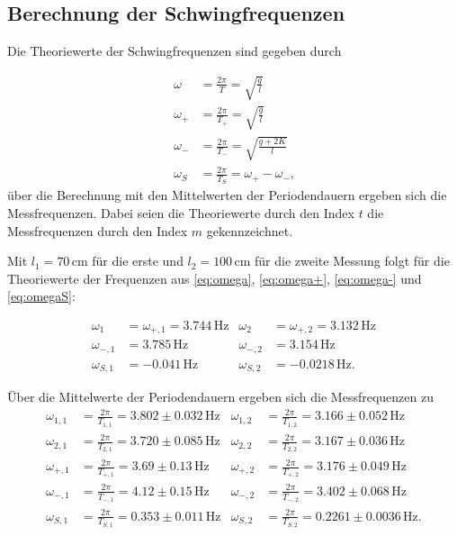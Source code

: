 \newpage

\subsection{Berechnung der Schwingfrequenzen}

Die Theoriewerte der Schwingfrequenzen sind gegeben durch

\begin{align}
  \omega   & = \frac{2π}{T}     =   \sqrt{\frac{g}{l}} \label{eq:omega} \\
  \omega_+ & = \frac{2π}{T_+} =   \sqrt{\frac{g}{l}} \label{eq:omega+} \\
  \omega_- & = \frac{2π}{T_-} =\sqrt{\frac{g+2K}{l}} \label{eq:omega-} \\
  \omega_S & = \frac{2π}{T_S} =  \omega_+ -\omega_- \label{eq:omegaS} \text{,}
\end{align}
über die Berechnung mit den Mittelwerten der Periodendauern ergeben sich die Messfrequenzen. Dabei seien die Theoriewerte durch den Index $t$
die Messfrequenzen durch den Index $m$ gekennzeichnet.

Mit $l_1=70 \, \unit{\centi\meter}$ für die erste und $l_2= 100 \, \unit{\centi\meter}$ für die zweite Messung folgt für die Theoriewerte der Frequenzen aus \eqref{eq:omega}, \eqref{eq:omega+}, \eqref{eq:omega-} und \eqref{eq:omegaS}:

\begin{align}
\omega_1 & = \omega_{+,1} = 3.744 \, \unit{\hertz}   & \omega_2 & = \omega_{+,2} = 3.132 \, \unit{\hertz} \nonumber\\
\omega_{-,1} & = 3.785            \, \unit{\hertz}   & \omega_{-,2} & = 3.154            \, \unit{\hertz} \nonumber \\
\omega_{S,1} & = -0.041           \, \unit{\hertz}   & \omega_{S,2} & = -0.0218          \, \unit{\hertz} \nonumber \text{.}
\end{align}

Über die Mittelwerte der Periodendauern ergeben sich die Messfrequenzen zu
\begin{align}
\omega_{1,1} & = \frac{2π}{T_{1,1}}   = 3.802 \pm 0.032     \,\unit{\hertz}& \omega_{1,2} & =  \frac{2π}{T_{1,2}}         = 3.166   \pm 0.052 \,\unit{\hertz}   \nonumber\\
\omega_{2,1} & = \frac{2π}{T_{2,1}}  = 3.720 \pm 0.085      \,\unit{\hertz}& \omega_{2,2} & =  \frac{2π}{T_{2,2}}         = 3.167   \pm 0.036 \,\unit{\hertz}   \nonumber\\
\omega_{+,1} & = \frac{2π}{T_{+,1}}  = 3.69 \pm 0.13        \,\unit{\hertz}& \omega_{+,2} & =  \frac{2π}{T_{+,2}}         = 3.176   \pm 0.049 \,\unit{\hertz}   \nonumber\\
\omega_{-,1} & = \frac{2π}{T_{-,1}}  = 4.12 \pm 0.15        \,\unit{\hertz}& \omega_{-,2} & =  \frac{2π}{T_{-,2}}         = 3.402   \pm 0.068 \,\unit{\hertz}   \nonumber\\
\omega_{S,1} & = \frac{2π}{T_{S,1}} = 0.353 \pm 0.011       \,\unit{\hertz}& \omega_{S,2} & =   \frac{2π}{T_{S,2}}        = 0.2261  \pm 0.0036 \,\unit{\hertz} \nonumber \text{.}

\end{align} 

